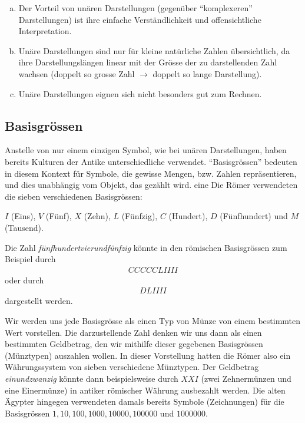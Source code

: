 \begin{myremark}\phantom{1}
  \begin{enumerate}[(a)]
    \item Der Vorteil von unären Darstellungen (gegenüber \enquote{komplexeren} Darstellungen) ist ihre einfache Verständlichkeit und
offensichtliche Interpretation.
    \item Unäre Darstellungen sind nur für kleine natürliche Zahlen übersichtlich, da ihre Darstellungslängen linear mit der Grösse der zu
darstellenden Zahl wachsen (doppelt so grosse Zahl $\rightarrow$ doppelt so lange Darstellung).
    \item Unäre Darstellungen eignen sich nicht besonders gut zum Rechnen. %
    \end{enumerate} 
\end{myremark}

\subsection{Basisgrössen}\label{subsection:Basisgroessen}
Anstelle von nur einem einzigen Symbol, wie bei unären Darstellungen, haben bereits Kulturen der Antike unterschiedliche
 verwendet. ``Basisgrössen'' bedeuten in diesem Kontext für Symbole, die gewisse Mengen, bzw. Zahlen repräsentieren, und dies unabhängig vom Objekt, das gezählt wird. eine Die Römer verwendeten die sieben verschiedenen Basisgrössen:
\begin{center}
  $I$ (Eins), $V$ (Fünf), $X$ (Zehn), $L$ (Fünfzig), $C$ (Hundert), $D$ (Fünfhundert) und $M$ (Tausend). 
\end{center}
\begin{myexample}\label{myexample:roman}
  Die Zahl \textit{fünfhundertvierundfünfzig} könnte in den römischen Basisgrössen zum Beispiel durch
  \begin{align*}
    CCCCCLIIII
  \end{align*}
  oder durch
  \begin{align*}
    DLIIII
  \end{align*}
  dargestellt werden. 
\end{myexample}
Wir werden uns jede Basisgrösse als einen Typ von Münze von einem bestimmten Wert vorstellen. Die darzustellende Zahl
denken wir uns dann als einen bestimmten Geldbetrag, den wir mithilfe dieser gegebenen Basisgrössen (Münztypen) auszahlen wollen. In
dieser Vorstellung hatten die Römer also ein Währungssystem von sieben verschiedene Münztypen. Der Geldbetrag \textit{einundzwanzig} könnte
dann beispielsweise durch $XXI$ (zwei Zehnermünzen und eine Einermünze) in antiker römischer Währung ausbezahlt werden. Die alten Ägypter hingegen verwendeten damals bereits Symbole (Zeichnungen) für die Basisgrössen $1, 10, 100, 1000, 10000,
100000$ und $1000000$.

